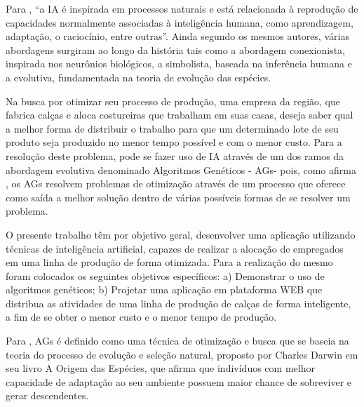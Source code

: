 \par Para , “a IA é inspirada  em  
processos naturais e está relacionada à reprodução de   capacidades  
normalmente   associadas   à   inteligência   humana,   como aprendizagem,
adaptação,   o   raciocínio,   entre   outras”.   Ainda   segundo   os   mesmos
autores,   várias  abordagens   surgiram   ao   longo   da   história   tais   como  
a abordagem   conexionista,   inspirada   nos  neurônios   biológicos,   a  
simbolista, baseada   na   inferência   humana   e   a   evolutiva, fundamentada na teoria
de evolução das espécies.

\par Na busca por otimizar seu processo de produção, uma empresa da região, que
fabrica calças e aloca costureiras que trabalham em suas casas, deseja saber
qual a melhor forma de distribuir o trabalho para que um determinado lote de seu produto
seja produzido no menor tempo possível e com o menor custo. Para a resolução
deste problema, pode se fazer uso de IA através de um dos ramos da abordagem
evolutiva denominado Algoritmos Genéticos - AGs\footnotemark[2] - pois, como
afirma , os AGs resolvem problemas de
otimização através de um processo que oferece como saída a melhor solução
dentro de várias possíveis formas de se resolver um problema.



\par O presente trabalho têm por objetivo geral, desenvolver uma aplicação
utilizando técnicas de inteligência artificial, capazes de realizar a alocação
de empregados em uma linha de produção de forma otimizada. Para a realização do mesmo foram
colocados os seguintes objetivos específicos: a) Demonstrar o uso de algoritmos
genéticos; b) Projetar uma aplicação em plataforma WEB que distribua as
atividades de uma linha de produção de calças de forma inteligente, a fim de se
obter o menor custo e o menor tempo de produção.

\par Para , AGs é definido
como uma técnica de otimização e busca que se baseia na teoria do processo de evolução e seleção
natural, proposto por Charles Darwin em seu livro A Origem das Espécies, que
afirma que indivíduos com melhor capacidade de adaptação ao seu ambiente possuem
maior chance de sobreviver e gerar descendentes.

